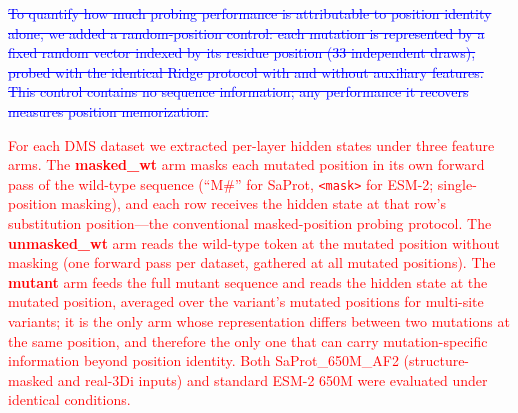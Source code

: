 \documentclass[11pt,a4paper]{article}
\newcommand{\rev}[1]{\textcolor{red}{#1}}
\begin{document}
\textcolor{blue}{\sout{To quantify how much probing performance is attributable to position identity
alone, we added a random-position control: each mutation is represented by a
fixed random vector indexed by its residue position (33 independent draws), probed with
the identical Ridge protocol with and without auxiliary features. This control contains
no sequence information; any performance it recovers measures position memorization.}}

\textcolor{red}{\rev{For each DMS dataset we extracted per-layer hidden states under three feature
arms. The \textbf{masked\_wt} arm masks each mutated position in its own forward
pass of the wild-type sequence (``M\#'' for SaProt, \texttt{<mask>} for ESM-2;
single-position masking), and each row receives the hidden state at that row's
substitution position---the conventional masked-position probing protocol.
The \textbf{unmasked\_wt} arm reads the wild-type token at the mutated position
without masking (one forward pass per dataset, gathered at all mutated
positions). The \textbf{mutant} arm feeds the full mutant sequence and reads the
hidden state at the mutated position, averaged over the variant's mutated
positions for multi-site variants; it is the only arm whose representation
differs between two mutations at the same position, and therefore the only one
that can carry mutation-specific information beyond position identity. Both
SaProt\_650M\_AF2 (structure-masked and real-3Di inputs) and standard ESM-2 650M
were evaluated under identical conditions.}}
\end{document}
